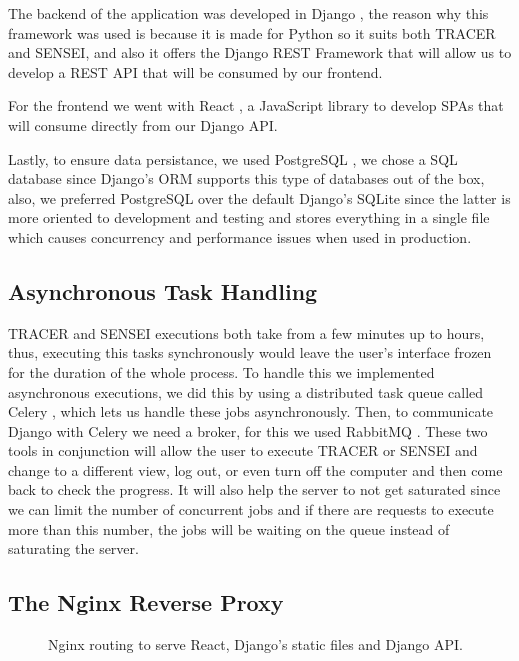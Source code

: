 The backend of the application was developed in Django \autocite{Django},
the reason why this framework was used is because it is made for Python
so it suits both \ac{TRACER} and SENSEI,
and also it offers the Django REST Framework \autocite{DjangoRESTFramework}
that will allow us to develop a \ac{REST} \ac{API} that will be consumed by our frontend.

For the frontend we went with React \autocite{React},
a JavaScript library to develop \acp{SPA}
that will consume directly from our Django \ac{API}.

Lastly, to ensure data persistance,
we used PostgreSQL \autocite{PostgreSQL2025},
we chose a \ac{SQL} database since Django's \ac{ORM} supports this type of databases out of the box,
also, we preferred PostgreSQL over the default Django's SQLite
since the latter is more oriented to development and testing
and stores everything in a single file which causes concurrency and performance issues when used in production.

\subsection{Asynchronous Task Handling}

\ac{TRACER} and SENSEI executions both take from a few minutes up to hours,
thus, executing this tasks synchronously would leave the user's interface frozen
for the duration of the whole process.
To handle this we implemented asynchronous executions,
we did this by using a distributed task queue called Celery \autocite{Celery},
which lets us handle these jobs asynchronously.
Then, to communicate Django with Celery we need a broker,
for this we used RabbitMQ \autocite{RabbitMQ}.
These two tools in conjunction will allow the user to execute \ac{TRACER} or SENSEI
and change to a different view, log out, or even turn off the computer
and then come back to check the progress.
It will also help the server to not get saturated
since we can limit the number of concurrent jobs
and if there are requests to execute more than this number,
the jobs will be waiting on the queue instead of saturating the server.


\subsection{The Nginx Reverse Proxy}

\begin{figure}[htbp]
    \centering
    
    \caption{Nginx routing to serve React, Django's static files and Django API.}
    \label{fig:nginx-routing}
\end{figure}

